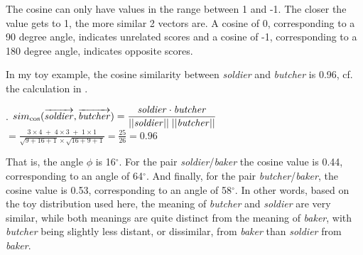 The cosine can only have values in the range between 1 and -1. The
closer the value gets to 1, the more similar 2 vectors
are. A cosine of 0, corresponding to a 90 degree angle, indicates
unrelated scores and a cosine of -1, corresponding to a 180 degree
angle, indicates opposite scores.

In my toy example, the cosine similarity between \emph{soldier} and
\emph{butcher} is 0.96, cf. the calculation in \Next.

\ex. %
\( \displaystyle 
sim_{\text{cos}}(\overrightarrow{\text{\textit{soldier}}}, \overrightarrow{\text{\textit{butcher}}}) = \frac{\text{\textit{soldier}} \cdot \text{\textit{butcher}}}{||\text{\textit{soldier}}||\;||\text{\textit{butcher}}||}\)
\\[.5em] 
\( \displaystyle = \frac{3 \times 4 \;+\; 4 \times 3 \;+\; 1 \times 1}
{\sqrt{9+16+1}\times\sqrt{16+9+1}} = \frac{25}{26} = 0.96 \)

That is, the angle $\phi$ is 16$^{\circ}$. For the pair
\emph{soldier}/\emph{baker} the cosine value is 0.44,
corresponding to an angle of 64$^{\circ}$. And finally, for the pair
\emph{butcher}/\emph{baker}, the cosine value is 0.53, corresponding to
an angle of 58$^{\circ}$. In other words, based on the toy
distribution used here, the meaning of \emph{butcher} and \emph{soldier} are
very similar, while both meanings are quite distinct from the meaning
of \emph{baker}, with \emph{butcher} being slightly less distant, or dissimilar, from \emph{baker} than \emph{soldier} from \emph{baker}.




